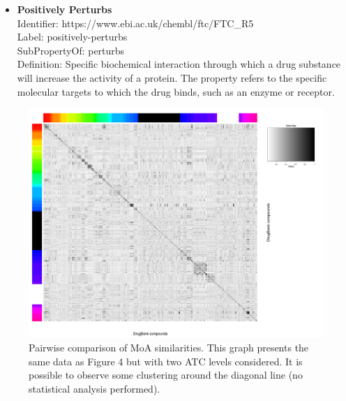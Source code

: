 \documentclass{bioinfo}
\begin{document}
\begin{itemize}
\item \textbf{Positively Perturbs} \\
Identifier: https://www.ebi.ac.uk/chembl/ftc/FTC\_R5 \\
Label: positively-perturbs \\
SubPropertyOf: perturbs \\
Definition: Specific biochemical interaction through which a drug substance will increase the activity of a protein. 
The property refers to the specific molecular targets to which the drug binds, such as an enzyme or receptor.
\end{itemize}


\begin{figure}[!tpb]%
\centerline{\includegraphics{figS3.png}}
\caption{Pairwise comparison of MoA similarities. This graph presents the same 
data as Figure 4 but with two ATC levels considered. It is possible to observe some clustering around the diagonal line (no
statistical analysis performed).}\label{fig:S03}
\end{figure}
\end{document}
